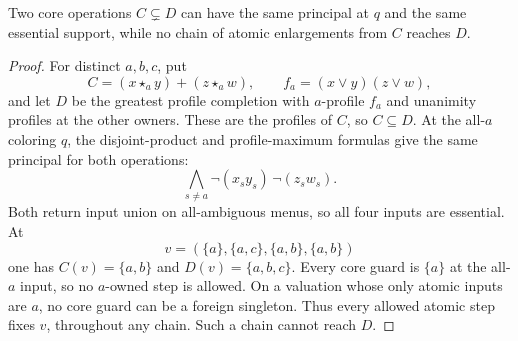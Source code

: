 \begin{proposition}
\label{core:prop:atomic-repair-incomplete}
Two core operations $C\subsetneq D$ can have the same principal
at $q$ and the same essential support, while no chain of atomic
enlargements from $C$ reaches $D$.
\end{proposition}
\begin{proof}
For distinct $a,b,c$, put
\[
 C=(x\star_a y)+(z\star_a w),\qquad
 f_a=(x\lor y)(z\lor w),
\]
and let $D$ be the greatest profile completion with $a$-profile
$f_a$ and unanimity profiles at the other owners. These are the
profiles of $C$, so $C\subseteq D$.
At the all-$a$ coloring $q$, the disjoint-product and profile-maximum
formulas give the same principal for both operations:
\[
 \bigwedge_{s\ne a}\neg(x_sy_s)\,\neg(z_sw_s).
\]
Both return input union on all-ambiguous menus, so all four inputs
are essential. At
\[
 v=(\{a\},\{a,c\},\{a,b\},\{a,b\})
\]
one has $C(v)=\{a,b\}$ and $D(v)=\{a,b,c\}$.
Every core guard is $\{a\}$ at the all-$a$ input, so no
$a$-owned step is allowed. On a valuation whose only atomic inputs
are $a$, no core guard can be a foreign singleton. Thus every
allowed atomic step fixes $v$, throughout any chain. Such a chain
cannot reach $D$.
\end{proof}


